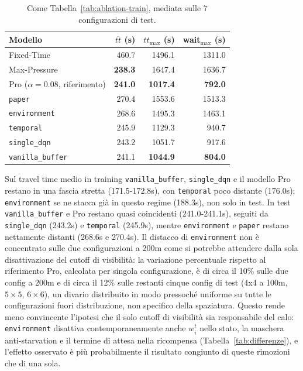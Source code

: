 \begin{table}[htbp]
  \centering
  \begin{tabular}{@{}lrrr@{}}
    \toprule
    Modello                          & $\overline{tt}$ (s) & $tt_{\max}$ (s) & wait$_{\max}$ (s) \\
    \midrule
    Fixed-Time                       & 460.7               & 1496.1          & 1311.0            \\
    Max-Pressure                     & \textbf{238.3}      & 1647.4          & 1636.7            \\
    Pro ($\alpha=0.08$, riferimento) & \textbf{241.0}      & \textbf{1017.4} & \textbf{792.0}    \\
    \texttt{paper}                   & 270.4               & 1553.6          & 1513.3            \\
    \texttt{environment}             & 268.6               & 1495.3          & 1463.1            \\
    \texttt{temporal}                & 245.9               & 1129.3          & 940.7             \\
    \texttt{single\_dqn}             & 243.2               & 1051.7          & 917.6             \\
    \texttt{vanilla\_buffer}         & 241.1               & \textbf{1044.9} & \textbf{804.0}    \\
    \bottomrule
  \end{tabular}
  \caption{Come Tabella~\ref{tab:ablation-train}, mediata sulle 7
    configurazioni di test.}
  \label{tab:ablation-test}
\end{table}

Sul travel time medio in training \texttt{vanilla\_buffer},
\texttt{single\_dqn} e il modello Pro restano in
una fascia stretta (171.5-172.8s), con \texttt{temporal} poco distante (176.0s);
\texttt{environment} se ne stacca già in questo regime (188.3s), non solo in test.
In test \texttt{vanilla\_buffer} e Pro restano quasi coincidenti (241.0-241.1s),
seguiti da \texttt{single\_dqn} (243.2s) e \texttt{temporal} (245.9s), mentre
\texttt{environment} e \texttt{paper} restano nettamente distanti (268.6s e 270.4s).
Il distacco di \texttt{environment} non è concentrato sulle due
configurazioni a 200m come si potrebbe attendere dalla sola disattivazione
del cutoff di visibilità: la variazione percentuale rispetto al riferimento
Pro, calcolata per singola configurazione, è di circa il 10\% sulle due
config a 200m e di circa il 12\% sulle restanti cinque config di test (4x4
a 100m, $5\times5$, $6\times6$), un divario distribuito in modo pressoché
uniforme su tutte le configurazioni fuori distribuzione, non specifico
della spaziatura. Questo rende meno convincente l'ipotesi che il solo
cutoff di visibilità sia responsabile del calo: \texttt{environment}
disattiva contemporaneamente anche $w_i^t$ nello stato, la maschera
anti-starvation e il termine di attesa nella ricompensa
(Tabella~\ref{tab:differenze}), e l'effetto osservato è più probabilmente
il risultato congiunto di queste rimozioni che di una sola.


